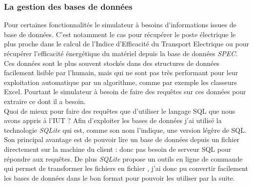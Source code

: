 \subsubsection{La gestion des bases de données}
Pour certaines fonctionnalités le simulateur à besoins d'informations issues de base de données. C'est notamment le cas pour récupérer le poste électrique le plus proche dans le calcul de l'Indice d'Efficacité du Transport Electrique ou pour récupérer l'efficacité énergétique du matériel depuis la base de données \emph{SPEC}.\\
Ces données sont le plus souvent stockés dans des structures de données facilement lisible par l'humain, mais qui ne sont pas très performant pour leur exploitation automatique par un algorithme, comme par exemple les classeurs Excel. Pourtant le simulateur à besoin de faire des requêtes sur ces données pour extraire ce dont il a besoin.\\

Quoi de mieux pour faire des requêtes que d'utiliser le langage SQL que nous avons appris à l'IUT ? Afin d'exploiter les bases de données j'ai utilisé la technologie \emph{SQLite} qui est, comme son nom l'indique, une version légère de SQL. Son principal avantage est de pouvoir lire un base de données depuis un fichier directement sur la machine du client : donc pas besoin de serveur SQL pour répondre aux requêtes. De plus \emph{SQLite} propose un outils en ligne de commande qui permet de transformer les fichiers  en fichier , j'ai donc pu convertir facilement les bases de données dans le bon format pour pouvoir les utiliser par la suite.